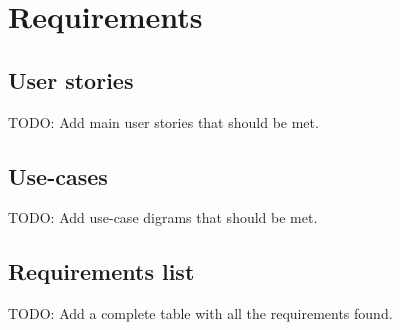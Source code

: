 \chapter{Requirements}

\section{User stories}
TODO: Add main user stories that should be met.

\section{Use-cases}
TODO: Add use-case digrams that should be met.

\section{Requirements list}
TODO: Add a complete table with all the requirements found.

%
